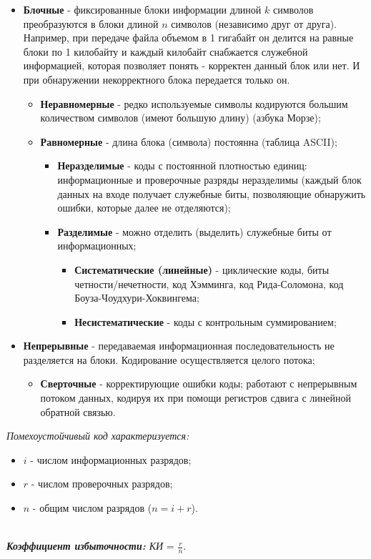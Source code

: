 \begin{itemize}
\item \textbf{Блочные} - фиксированные блоки информации длиной $k$ символов преобразуются в блоки длиной $n$ символов (независимо друг от друга). Например, при передаче файла объемом в 1 гигабайт он делится на равные блоки по 1 килобайту и каждый килобайт снабжается служебной информацией, которая позволяет понять - корректен данный блок или нет. И при обнаружении некорректного блока передается только он.
    \begin{itemize}
      \item \textbf{Неравномерные} - редко используемые символы кодируются большим количеством символов (имеют большую длину) (азбука Морзе);
      \item \textbf{Равномерные} - длина блока (символа) постоянна (таблица ASCII);
      \begin{itemize}
        \item \textbf{Неразделимые} - коды с постоянной плотностью единиц: информационные и проверочные разряды неразделимы (каждый блок данных на входе получает служебные биты, позволяющие обнаружить ошибки, которые далее не отделяются);
        \item \textbf{Разделимые} - можно отделить (выделить) служебные биты от информационных;
        \begin{itemize}
          \item \textbf{Систематические (линейные)} - циклические коды, биты четности/нечетности, код Хэмминга, код Рида-Соломона, код Боуза-Чоудхури-Хоквингема;
          \item \textbf{Несистематические} - коды с контрольным суммированием;
        \end{itemize}
      \end{itemize}
    \end{itemize}
\item \textbf{Непрерывные} - передаваемая информационная последовательность не разделяется на блоки. Кодирование осуществляется целого потока;
    \begin{itemize}
     \item \textbf{Сверточные} - корректирующие ошибки коды; работают с непрерывным потоком данных, кодируя их при помощи регистров сдвига с линейной обратной связью.
     \end{itemize}
\end{itemize}
\begin{center}
\emph{Помехоустойчивый код характеризуется:}
\end{center}
\begin{itemize}
\item$i$ - числом информационных разрядов;
\item$r$ - числом проверочных разрядов;
\item$n$ - общим числом разрядов ($n = i + r$).
\\\\
\end{itemize}
\emph{\textbf{Коэффициент избыточности:} КИ} = $\frac{r}{n}$.

